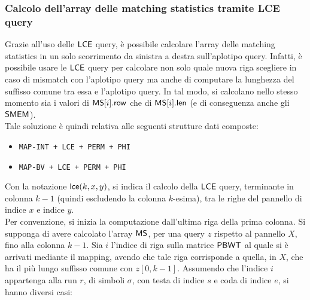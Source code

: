 \subsubsection{Calcolo dell'array delle matching statistics tramite LCE query}
Grazie all'uso delle $\mbox{\rm {\sf LCE}}$ query, è possibile calcolare
l'array 
delle matching statistics in un solo scorrimento da sinistra a
destra sull'aplotipo query. Infatti, è possibile usare le $\mbox{\rm {\sf LCE}}$ query per
calcolare non solo quale nuova 
riga scegliere in caso di mismatch con l'aplotipo
query ma anche di computare la lunghezza
del suffisso comune tra essa e l'aplotipo query. In tal modo, si calcolano nello
stesso momento sia i valori di $\mbox{\rm {\sf MS}}[i].\mbox{\rm {\sf row}}$ che di $\mbox{\rm {\sf MS}}[i].\mbox{\rm {\sf len}}$ (e di
conseguenza anche gli $\mbox{\rm {\sf SMEM}}$).\\
Tale soluzione è quindi relativa alle seguenti strutture dati composte:
\begin{itemize}
  \item \texttt{MAP-INT + LCE + PERM + PHI}
  \item \texttt{MAP-BV + LCE + PERM + PHI}
\end{itemize}
Con la notazione $\mbox{\rm {\sf lce}}(k, x, y)$,
si indica il calcolo della $\mbox{\rm {\sf LCE}}$ query, terminante in colonna $k-1$ (quindi
escludendo la colonna 
$k$-esima), tra le righe del pannello di indice $x$ e
indice $y$.\\ 
Per convenzione, si inizia la computazione dall'ultima 
riga della prima colonna.
Si supponga di avere calcolato l'array $\mbox{\rm {\sf MS}}$, per una query $z$ rispetto al
pannello $X$, fino alla
colonna $k-1$. Sia $i$ 
l'indice di riga sulla matrice $\mbox{\rm {\sf PBWT}}$ al quale si è arrivati mediante il
mapping, avendo che tale riga corrisponde a quella, in $X$, che ha il più lungo
suffisso 
comune con 
$z[0,k-1]$. Assumendo che l'indice $i$ appartenga alla run $r$, di simboli
$\sigma$, con testa di indice $s$ e coda di indice $e$, si hanno diversi casi:
